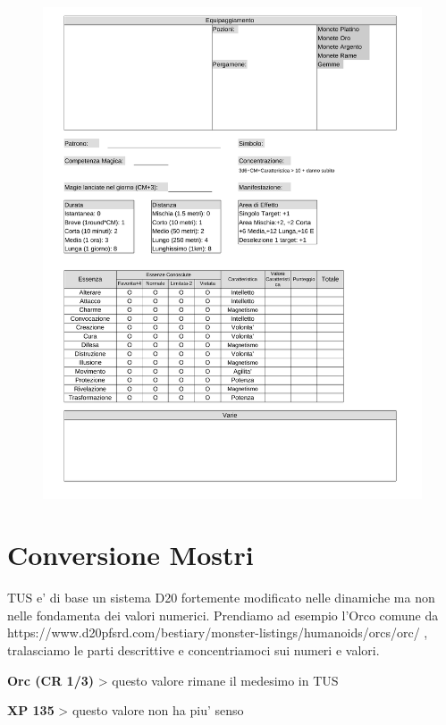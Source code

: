 \documentclass[a4paper,11pt,twoside,openany]{dndbook}
\begin{document}
{\begin{figure}
	\includegraphics[width=1.13\linewidth]{TUS-Scheda-2.png}
\end{figure}


\pagebreak

\section*{Conversione Mostri}

TUS e' di base un sistema D20 fortemente modificato nelle dinamiche ma non nelle fondamenta dei valori numerici. Prendiamo ad esempio l'Orco comune da https://www.d20pfsrd.com/bestiary/monster-listings/humanoids/orcs/orc/ , tralasciamo le parti descrittive e concentriamoci sui numeri e valori.

\bigskip

\textbf{Orc (CR 1/3)} \textgreater{} questo valore rimane il medesimo in TUS

\textbf{XP 135} \textgreater{} questo valore non ha piu' senso 

}
\end{document}
